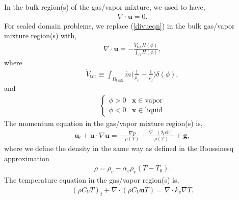 \documentclass[]{article}
\begin{document}
In the bulk region(s) of the gas/vapor mixture, we used to have,
\begin{eqnarray}
\nabla \cdot \bm{u} = 0.  \label{divueqn}
\end{eqnarray}
For sealed domain problems, we replace (\ref{divueqn}) in the
bulk gas/vapor mixture region(s) with,
\begin{eqnarray*}
\nabla\cdot\bm{u} = 
-\frac{\dot{V}_{\textrm{tot}} H(\phi)}{\int_{\Omega}H(\phi)},
\end{eqnarray*}
where
\begin{eqnarray*}
\displaystyle \dot{V}_{\textrm{tot}} \equiv 
\int_{\Omega_{\textrm{tank}}} 
\dot{m}\big(\frac{1}{\rho_v}-\frac{1}{\rho_l}\big)\delta(\phi),
\end{eqnarray*}
and
\begin{eqnarray*}
\left\{ \begin{array}{cc}
\phi>0 & \bm{x}\in\textrm{vapor} \\
\phi<0 & \bm{x}\in\textrm{liquid}
\end{array} \right.
\end{eqnarray*}
The momentum equation in the gas/vapor mixture region(s) is,
\begin{eqnarray*}
\displaystyle \bm{u}_t +\bm{u}\cdot\nabla\bm{u} = 
-\frac{\nabla p}{\rho(T)} +
\frac{\nabla\cdot(2\mu \mathbb{D})}{\rho(T)}+\bm{g},
\end{eqnarray*}
where we define the density in the same way as defined in the 
Boussinesq approximation 
\begin{eqnarray*}
\rho = \rho_v - \alpha_v\rho_v(T-T_{0}).
\end{eqnarray*}
The temperature equation in the gas/vapor region(s) is,
\begin{eqnarray*}
(\rho C_V T)_t + \nabla\cdot(\rho C_V\bm{u}T) = \nabla\cdot k_v\nabla T.
\end{eqnarray*}
\end{document}
